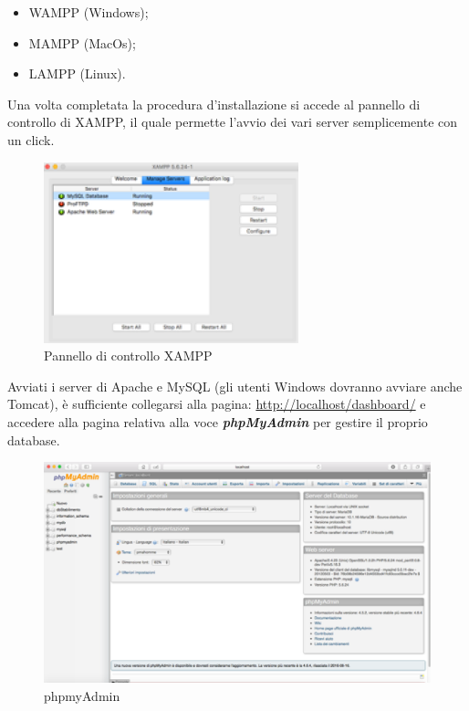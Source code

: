 \begin{itemize}

\item WAMPP (Windows);
\item MAMPP (MacOs);
\item LAMPP (Linux). 

\end{itemize}

Una volta completata la procedura d'installazione si accede al pannello di controllo di XAMPP, il quale permette l'avvio dei vari server semplicemente con un click. 

\begin{center}
\begin{figure}[H]
\centering
\includegraphics[scale=1]{figures/XAMPP.png}
\caption{Pannello di controllo XAMPP} 
\end{figure}
\end{center}

Avviati i server di Apache e MySQL (gli utenti Windows dovranno avviare anche Tomcat), è sufficiente collegarsi alla pagina: \url{http://localhost/dashboard/} e accedere alla pagina relativa alla voce \textit{\textbf{phpMyAdmin}} per gestire il proprio database. 

\begin{center}
\begin{figure}[H]
\centering
\includegraphics[scale=0.8]{figures/phpmyAdmin.png}
\caption{phpmyAdmin} 
\end{figure}
\end{center}

